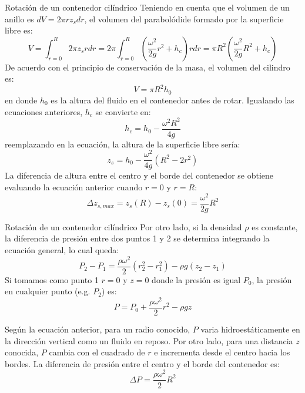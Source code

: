 \documentclass [xcolor=svgnames, t] {beamer}
\begin{document}
\begin{frame}{Rotaci\'on de un contenedor cil\'indrico}
\vspace{-0.4cm}
\footnotesize
Teniendo en cuenta que el volumen de un anillo es $dV = 2\pi r z_s dr$, el volumen del parabol\'odide formado por la superficie libre es:
$$
V = \int_{r=0}^R 2\pi z_s r dr = 2\pi \int_{r=0}^R \left( \frac{\omega^2}{2g} r^2 + h_c \right) r dr = \pi R^2 \left( \frac{\omega^2}{2g} R^2 + h_c \right)
$$
De acuerdo con el principio de conservaci\'on de la masa, el volumen del cilindro es:
$$
V=\pi R^2 h_0
$$
en donde $h_0$ es la altura del fluido en el contenedor antes de rotar. Igualando las ecuaciones anteriores, $h_c$ se convierte en:
$$
h_c = h_0 - \frac{\omega^2 R^2}{4g}
$$
reemplazando en la ecuaci\'on, la altura de la superficie libre ser\'ia:
$$
z_s = h_0 - \frac{\omega^2}{4g} ( R^2 -2r^2 )
$$
La diferencia de altura entre el centro y el borde del contenedor se obtiene evaluando la ecuaci\'on anterior cuando $r=0$ y $r=R$:
$$
\Delta z_{s,max} = z_s (R)- z_s (0) = \frac{\omega^2}{2g} R^2
$$
\end{frame}

\begin{frame}{Rotaci\'on de un contenedor cil\'indrico}
\vspace{-0.4cm}
\footnotesize
Por otro lado, si la densidad $\rho$ es constante, la diferencia de presi\'on entre dos puntos 1 y 2 se determina integrando la ecuaci\'on general, lo cual queda:
$$
P_2 - P_1 = \frac{\rho \omega^2}{2}(r_2^2 - r_1^2 ) - \rho g (z_2 - z_1)
$$
Si tomamos como punto 1 $r=0$ y $z=0$ donde la presi\'on es igual $P_0$, la presi\'on en cualquier punto (e.g. $P_2$) es:
$$
P = P_0 + \frac{\rho \omega^2}{2} r^2 - \rho g z 
$$

Seg\'un la ecuaci\'on anterior, para un radio conocido, $P$ varia hidroest\'aticamente en la direcci\'on vertical como un fluido en reposo. Por otro lado, para una distancia $z$ conocida, $P$ cambia con el cuadrado de $r$ e incrementa desde el centro hacia los bordes. La diferencia de presi\'on entre el centro y el borde del contenedor es:
$$
\Delta P = \frac{\rho \omega^2}{2} R^2 
$$
\end{frame}
\end{document}
